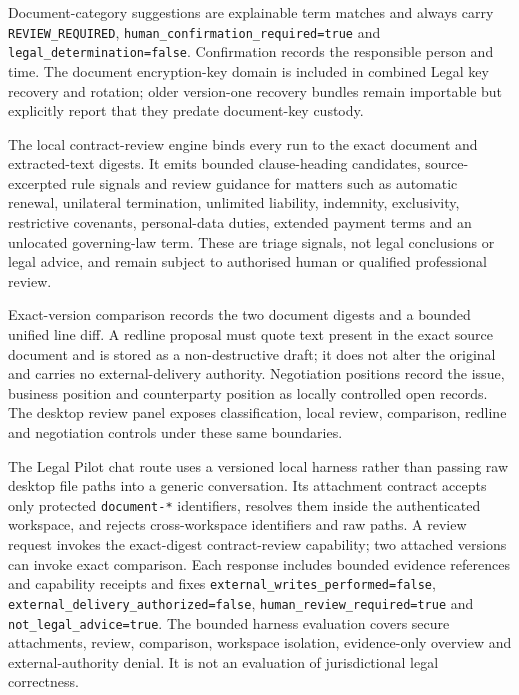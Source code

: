 Document-category suggestions are explainable term matches and always carry
\texttt{REVIEW\_REQUIRED}, \texttt{human\_confirmation\_required=true} and
\texttt{legal\_determination=false}.  Confirmation records the responsible
person and time.  The document encryption-key domain is included in combined
Legal key recovery and rotation; older version-one recovery bundles remain
importable but explicitly report that they predate document-key custody.

The local contract-review engine binds every run to the exact document and
extracted-text digests.  It emits bounded clause-heading candidates,
source-excerpted rule signals and review guidance for matters such as automatic
renewal, unilateral termination, unlimited liability, indemnity, exclusivity,
restrictive covenants, personal-data duties, extended payment terms and an
unlocated governing-law term.  These are triage signals, not legal conclusions
or legal advice, and remain subject to authorised human or qualified
professional review.

Exact-version comparison records the two document digests and a bounded unified
line diff.  A redline proposal must quote text present in the exact source
document and is stored as a non-destructive draft; it does not alter the
original and carries no external-delivery authority.  Negotiation positions
record the issue, business position and counterparty position as locally
controlled open records.  The desktop review panel exposes classification,
local review, comparison, redline and negotiation controls under these same
boundaries.

The Legal Pilot chat route uses a versioned local harness rather than passing
raw desktop file paths into a generic conversation.  Its attachment contract
accepts only protected \texttt{document-*} identifiers, resolves them inside
the authenticated workspace, and rejects cross-workspace identifiers and raw
paths.  A review request invokes the exact-digest contract-review capability;
two attached versions can invoke exact comparison.  Each response includes
bounded evidence references and capability receipts and fixes
\texttt{external\_writes\_performed=false},
\texttt{external\_delivery\_authorized=false},
\texttt{human\_review\_required=true} and
\texttt{not\_legal\_advice=true}.  The bounded harness evaluation covers secure
attachments, review, comparison, workspace isolation, evidence-only overview
and external-authority denial.  It is not an evaluation of jurisdictional legal
correctness.

